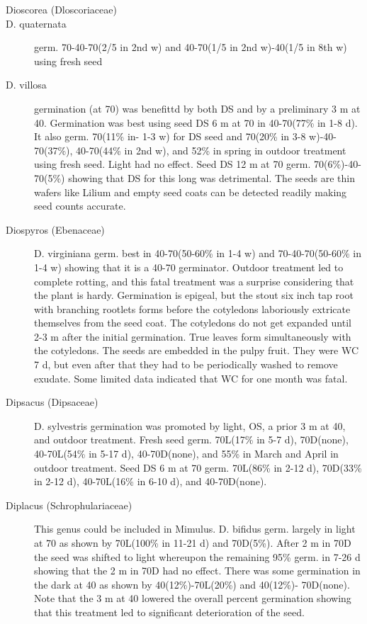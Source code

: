 \begin{description}
\item[Dioscorea (Dloscoriaceae)]
\item[D. quaternata] germ. 70-40-70(2/5 in 2nd w) and 40-70(1/5 in 2nd w)-40(1/5 in
8th w) using fresh seed
\item[D. villosa] germination (at 70) was benefittd by both DS and by a preliminary 3 m
at 40. Germination was best using seed DS 6 m at 70 in 40-70(77\% in 1-8 d). It also
germ. 70(11\% in- 1-3 w) for DS seed and 70(20\% in 3-8 w)-40-70(37\%), 40-70(44\% in
2nd w), and 52\% in spring in outdoor treatment using fresh seed. Light had no effect.
Seed DS 12 m at 70 germ. 70(6\%)-40-70(5\%) showing that DS for this long was
detrimental. The seeds are thin wafers like Lilium and empty seed coats can be
detected readily making seed counts accurate.
\item[Diospyros (Ebenaceae)] D. virginiana germ. best in 40-70(50-60\% in 1-4
w) and 70-40-70(50-60\% in 1-4 w) showing that it is a 40-70 germinator. Outdoor
treatment led to complete rotting, and this fatal treatment was a surprise considering
that the plant is hardy. Germination is epigeal, but the stout six inch tap root with
branching rootlets forms before the cotyledons laboriously extricate themselves from
the seed coat. The cotyledons do not get expanded until 2-3 m after the initial
germination. True leaves form simultaneously with the cotyledons. The seeds are
embedded in the pulpy fruit. They were WC 7 d, but even after that they had to be
periodically washed to remove exudate. Some limited data indicated that WC for one
month was fatal.
\item[Dipsacus (Dipsaceae)] D. sylvestris germination was promoted by light,
OS, a prior 3 m at 40, and outdoor treatment. Fresh seed germ. 70L(17\% in 5-7 d),
70D(none), 40-70L(54\% in 5-17 d), 40-70D(none), and 55\% in March and April in
outdoor treatment. Seed DS 6 m at 70 germ. 70L(86\% in 2-12 d), 70D(33\% in 2-12 d),
40-70L(16\% in 6-10 d), and 40-70D(none).

\item[Diplacus (Schrophulariaceae)] This genus could be included in
Mimulus. D. bifidus germ. largely in light at 70 as shown by 70L(100\% in 11-21 d) and
70D(5\%). After 2 m in 70D the seed was shifted to light whereupon the remaining
95\% germ. in 7-26 d showing that the 2 m in 70D had no effect. There was some
germination in the dark at 40 as shown by 40(12\%)-70L(20\%) and 40(12\%)-
70D(none). Note that the 3 m at 40 lowered the overall percent germination showing
that this treatment led to significant deterioration of the seed.


\end{description}
